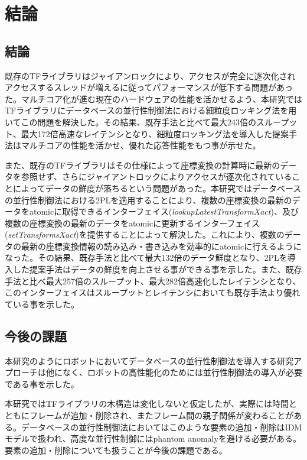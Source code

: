 \documentclass[a4paper]{jreport}	%
\begin{document}
\chapter{結論}
\section{結論}
既存のTFライブラリはジャイアンロックにより、アクセスが完全に逐次化されアクセスするスレッドが増えるに従ってパフォーマンスが低下する問題があった。マルチコア化が進む現在のハードウェアの性能を活かせるよう、本研究ではTFライブラリにデータベースの並行性制御法における細粒度ロッキング法を用いてこの問題を解決した。その結果、既存手法と比べて最大243倍のスループット、最大172倍高速なレイテンシとなり、細粒度ロッキング法を導入した提案手法はマルチコアの性能を活かせ、優れた応答性能をもつ事が示せた。


また、既存のTFライブラリはその仕様によって座標変換の計算時に最新のデータを参照せず、さらにジャイアントロックによりアクセスが逐次化されていることによってデータの鮮度が落ちるという問題があった。本研究ではデータベースの並行性制御法における2PLを適用することにより、複数の座標変換の最新のデータをatomicに取得できるインターフェイス(\textit{lookupLatestTransformXact})、及び複数の座標変換の最新のデータをatomicに更新するインターフェイス(\textit{setTransformsXact})を提供することによって解決した。これにより、複数のデータの最新の座標変換情報の読み込み・書き込みを効率的にatomicに行えるようになった。その結果、既存手法と比べて最大132倍のデータ鮮度となり、2PLを導入した提案手法はデータの鮮度を向上させる事ができる事を示した。また、既存手法と比べ最大257倍のスループット、最大282倍高速化したレイテンシとなり、このインターフェイスはスループットとレイテンシにおいても既存手法より優れている事を示した。

\section{今後の課題}
本研究のようにロボットにおいてデータベースの並行性制御法を導入する研究アプローチは他になく、ロボットの高性能化のためには並行性制御法の導入が必要である事を示した。

本研究ではTFライブラリの木構造は変化しないと仮定したが、実際には時間とともにフレームが追加・削除され、またフレーム間の親子関係が変わることがある。データベースの並行性制御法においてはこのような要素の追加・削除はIDMモデルで扱われ、高度な並行性制御にはphantom anomalyを避ける必要がある。要素の追加・削除についても扱うことが今後の課題である。
\end{document}
